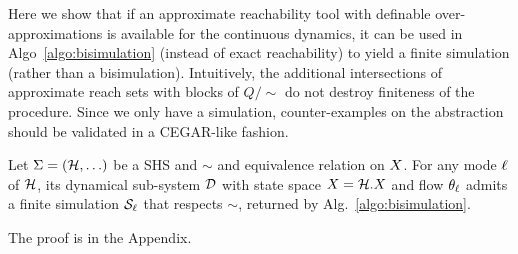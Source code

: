 Here we show that if an approximate reachability tool with definable over-approximations is available for the continuous dynamics, it can be used in Algo~\ref{algo:bisimulation} (instead of exact reachability) to yield a finite simulation (rather than a bisimulation).
Intuitively, the additional intersections of approximate reach sets with blocks of $Q/\sim$ do not destroy finiteness of the procedure.
Since we only have a simulation, counter-examples on the abstraction should be validated in a CEGAR-like fashion.
%
\begin{lemma}
	\label{lemma:finite simu}
	Let $\Sigma = (\mathcal{H},\ldots)$ be a SHS and $\sim$ and equivalence relation on $X$.
	For any mode $\ell$ of $\mathcal{H}$, its dynamical sub-system $\mathcal{D}$ with state space $X = \mathcal{H}.X$ and flow $\theta_\ell $ admits a finite simulation $\mathcal{S}_\ell$ that respects $\sim$, returned by Alg.~\ref{algo:bisimulation}.
\end{lemma}
The proof is in the Appendix.
